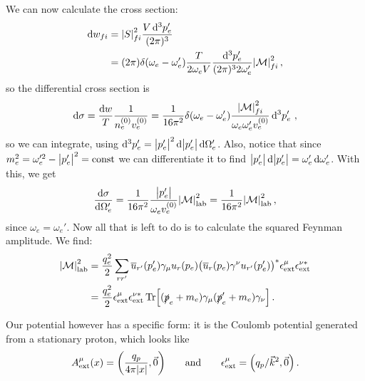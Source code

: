 \documentclass[main.tex]{subfiles}
\begin{document}
We can now calculate the cross section: 
%
\begin{align}
\dd{w_{fi}} &= \abs{S}_{fi}^2  \frac{V \dd[3]{p_e'}}{(2 \pi )^3}  \\
&= ( 2\pi ) \delta(\omega_{e} - \omega_{e}') \frac{T}{2 \omega_{e}V} 
\frac{ \dd[3]{p_e'}}{(2 \pi )^3 2 \omega_e'} \abs{\mathcal{M}}^2_{fi}
\,,
\end{align}
%
so the differential cross section is 
%
\begin{align}
\dd{\sigma } = \frac{ \dd{w}}{T}
\frac{1}{n_e^{(0)} v_e^{(0)}}
= \frac{1}{16 \pi^2} \delta(\omega_{e} - \omega_{e}')
\frac{\abs{\mathcal{M}}^2_{fi}}{\omega_{e} \omega_{e}' v_e^{(0)}} \dd[3]{p_e'}
\,,
\end{align}
%
so we can integrate, using \(\dd[3]{p_e'} = \abs{p_e'}^2 \dd{\abs{p_e'}} \dd{\Omega_{e}'}\). Also, notice that since \(m_e^2= \omega_{e}^{\prime 2} - \abs{p_e'}^2 = \text{const}\) we can differentiate it to find \(\abs{p_e'} \dd{\abs{p_e'}} = \omega_{e}' \dd{\omega_{e}'}\). With this, we get 
%
\begin{align}
\dv{\sigma }{\Omega'_e} = \frac{1}{16 \pi^2} \frac{\abs{p_e'}}{\omega_{e} v_e^{(0)}}
\abs{\mathcal{M}}^2 _{\text{lab}} 
= \frac{1}{16 \pi^2}
\abs{\mathcal{M}}^2 _{\text{lab}} 
\,,
\end{align}
%
since \(\omega_{e} = \omega_{e}'\). 
Now all that is left to do is to calculate the squared Feynman amplitude.
We find: 
%
\begin{align}
\abs{\mathcal{M}}^2 _{\text{lab}} &= \frac{q_e^2}{2}
\sum _{rr'} 
\overline{u}_{r'} (p_e') \gamma_{\mu } u_r (p_e)
\qty(\overline{u}_{r} (p_e) \gamma^{\nu} u_{r'} (p_e'))^{*}
\epsilon^{\mu } _{\text{ext}} \epsilon^{\nu *} _{\text{ext}}   \\
&= \frac{q_e^2}{2}  \epsilon^{\mu } _{\text{ext}} \epsilon^{\nu *} _{\text{ext}} 
\Tr[(\slashed{p}_e + m_e) \gamma_{\mu } (\slashed{p}_e' + m_e) \gamma_{\nu }]
\,.
\end{align}


Our potential however has a specific form: it is the Coulomb potential generated from a stationary proton, which looks like 
%
\begin{align}
A^{\mu } _{\text{ext}} (x) = \qty( \frac{q_p}{4 \pi \abs{x}}, \vec{0})
\qquad \text{and} \qquad
\epsilon^{\mu } _{\text{ext}} = \qty( q_p / \vec{k}^2, \vec{0})
\,.
\end{align}
\end{document}
